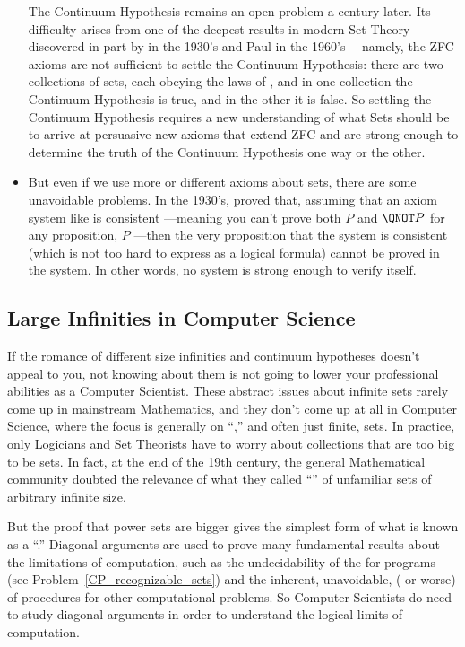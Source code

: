 \begin{itemize}
  The Continuum Hypothesis remains an open problem a century later.  Its
  difficulty arises from one of the deepest results in modern Set Theory
  ---discovered in part by  in the 1930's and Paul
   in the 1960's ---namely, the ZFC axioms are not sufficient
  to settle the Continuum Hypothesis: there are two collections of sets,
  each obeying the laws of , and in one collection the Continuum
  Hypothesis is true, and in the other it is false.  So settling the
  Continuum Hypothesis requires a new understanding of what Sets should be
  to arrive at persuasive new axioms that extend ZFC and are strong enough
  to determine the truth of the Continuum Hypothesis one way or the other.

\item But even if we use more or different axioms about sets, there are
  some unavoidable problems.  In the 1930's,  proved that,
  assuming that an axiom system like  is consistent ---meaning
  you can't prove both $P$ and $\QNOT P$ for any proposition, $P$ ---then
  the very proposition that the system is consistent (which is not too
  hard to express as a logical formula) cannot be proved in the system.
  In other words, no  system is strong enough to verify
  itself.
  
\end{itemize}

\subsection{Large Infinities in Computer Science}

If the romance of different size infinities and continuum hypotheses
doesn't appeal to you, not knowing about them is not going to lower your
professional abilities as a Computer Scientist.  These abstract issues
about infinite sets rarely come up in mainstream Mathematics, and they
don't come up at all in Computer Science, where the focus is generally on
``,'' and often just finite, sets.  In practice, only
Logicians and Set Theorists have to worry about collections that are too
big to be sets.  In fact, at the end of the 19th century, the general
Mathematical community doubted the relevance of what they called
``'' of unfamiliar sets of arbitrary infinite size.

But the proof that power sets are bigger gives the simplest form of what
is known as a ``.''  Diagonal arguments are used to
prove many fundamental results about the limitations of computation, such
as the undecidability of the  for programs (see
Problem~\ref{CP_recognizable_sets}) and the inherent, unavoidable,
 ( or worse) of procedures for
other computational problems.  So Computer Scientists do need to study
diagonal arguments in order to understand the logical limits of
computation.

